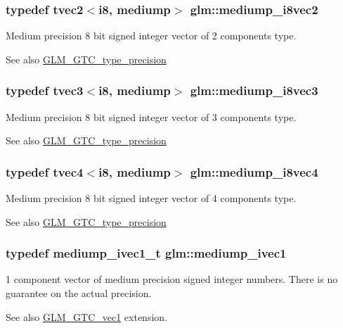 \subsubsection[{mediump\+\_\+i8vec2}]{\setlength{\rightskip}{0pt plus 5cm}typedef tvec2$<${\bf i8}, mediump$>$ {\bf glm\+::mediump\+\_\+i8vec2}}\label{namespaceglm_afb2f4e62d3b4e1da13ef6d6c891647cb}
Medium precision 8 bit signed integer vector of 2 components type. \begin{DoxySeeAlso}{See also}
\hyperlink{group__gtc__type__precision}{G\+L\+M\+\_\+\+G\+T\+C\+\_\+type\+\_\+precision} 
\end{DoxySeeAlso}
\hypertarget{namespaceglm_aeb9f1d74a3e4109e6630b86cbee32b06}{}
\subsubsection[{mediump\+\_\+i8vec3}]{\setlength{\rightskip}{0pt plus 5cm}typedef tvec3$<${\bf i8}, mediump$>$ {\bf glm\+::mediump\+\_\+i8vec3}}\label{namespaceglm_aeb9f1d74a3e4109e6630b86cbee32b06}
Medium precision 8 bit signed integer vector of 3 components type. \begin{DoxySeeAlso}{See also}
\hyperlink{group__gtc__type__precision}{G\+L\+M\+\_\+\+G\+T\+C\+\_\+type\+\_\+precision} 
\end{DoxySeeAlso}
\hypertarget{namespaceglm_a6b7949e7eb8b968b391876925d65f07c}{}
\subsubsection[{mediump\+\_\+i8vec4}]{\setlength{\rightskip}{0pt plus 5cm}typedef tvec4$<${\bf i8}, mediump$>$ {\bf glm\+::mediump\+\_\+i8vec4}}\label{namespaceglm_a6b7949e7eb8b968b391876925d65f07c}
Medium precision 8 bit signed integer vector of 4 components type. \begin{DoxySeeAlso}{See also}
\hyperlink{group__gtc__type__precision}{G\+L\+M\+\_\+\+G\+T\+C\+\_\+type\+\_\+precision} 
\end{DoxySeeAlso}
\hypertarget{namespaceglm_a7efcceaaa791c2380d1b17bd7baa45ee}{}
\subsubsection[{mediump\+\_\+ivec1}]{\setlength{\rightskip}{0pt plus 5cm}typedef mediump\+\_\+ivec1\+\_\+t {\bf glm\+::mediump\+\_\+ivec1}}\label{namespaceglm_a7efcceaaa791c2380d1b17bd7baa45ee}
1 component vector of medium precision signed integer numbers. There is no guarantee on the actual precision. \begin{DoxySeeAlso}{See also}
\hyperlink{group__gtc__vec1}{G\+L\+M\+\_\+\+G\+T\+C\+\_\+vec1} extension. 
\end{DoxySeeAlso}
\hypertarget{namespaceglm_a62712eb89ac9c8906f6cd76758774b33}{}
